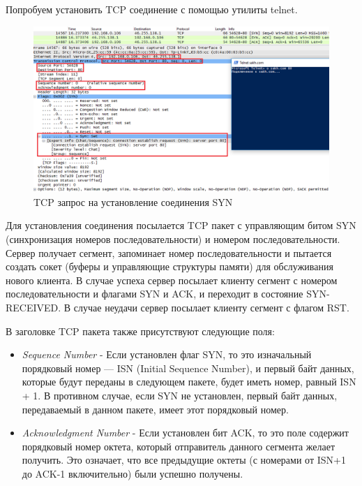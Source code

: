 \documentclass[14pt,a4paper,report]{report}
\begin{document}
Попробуем установить TCP соединение с помощью утилиты telnet.

\begin{figure}[h!]
	\centering
	\includegraphics[scale = 0.63]{images/tcp1.png}
	
	\caption{TCP запрос на установление соединения SYN}
	\label{image:15}
\end{figure}

Для установления соединения посылается TCP пакет с управляющим битом SYN (синхронизация номеров последовательности) и номером последовательности. Сервер получает сегмент, запоминает номер последовательности и пытается создать сокет (буферы и управляющие структуры памяти) для обслуживания нового клиента. В случае успеха сервер посылает клиенту сегмент с номером последовательности и флагами SYN и ACK, и переходит в состояние SYN-RECEIVED. В случае неудачи сервер посылает клиенту сегмент с флагом RST.

В заголовке TCP пакета также присутствуют следующие поля:

\begin{itemize}
	\item \emph{Sequence Number} - Если установлен флаг SYN, то это изначальный порядковый номер — ISN (Initial Sequence Number), и первый байт данных, которые будут переданы в следующем пакете, будет иметь номер, равный ISN + 1. В противном случае, если SYN не установлен, первый байт данных, передаваемый в данном пакете, имеет этот порядковый номер.
	\item \emph{Acknowledgment Number} -  Если установлен бит ACK, то это поле содержит порядковый номер октета, который отправитель данного сегмента желает получить. Это означает, что все предыдущие октеты (с номерами от ISN+1 до ACK-1 включительно) были успешно получены.
\end{itemize}
\end{document}
